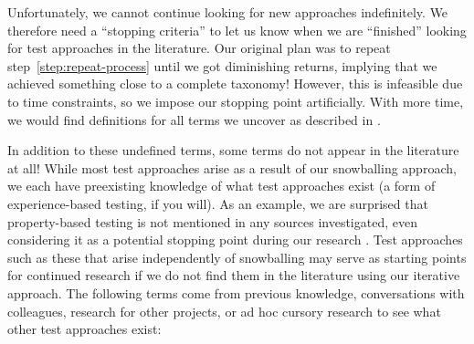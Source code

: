 Unfortunately, we cannot continue looking for new approaches indefinitely. We
therefore need a ``stopping criteria'' to let us know when we are ``finished''
looking for test approaches in the literature. Our original plan was to repeat
step~\ref{step:repeat-process} until we got diminishing returns, implying that
we achieved something close to a complete taxonomy! However, this is infeasible
due to time constraints, so we impose our stopping point artificially. With
more time, we would find definitions for all terms we uncover as described in
.

\ifnotpaper
    In addition to these undefined terms, some terms do not appear in
    the literature at all! While most test approaches arise as a result of our
    snowballing approach, we each have preexisting knowledge of what test
    approaches exist (a form of experience-based testing, if you will).
    As an example, we are surprised that property-based testing is not mentioned
    in any sources investigated, even considering it as a potential stopping point
    during our research%
    . Test approaches such as these that arise independently of snowballing may
    serve as starting points for continued research if we do not find them in
    the literature using our iterative approach. The following terms come from
    previous knowledge, conversations with colleagues, research for other
    projects, or ad hoc cursory research to see what other test approaches exist:
    \newline

